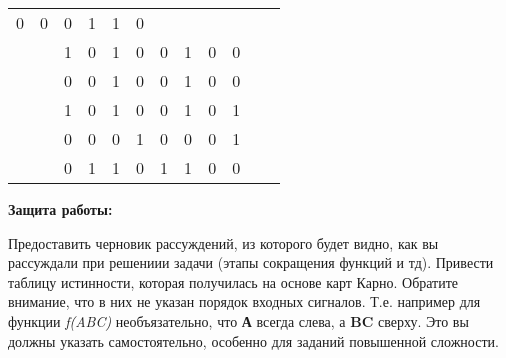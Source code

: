 \documentclass[12pt,a4paper,final,notitlepage]{article}
\begin{document}
\begin{table}[htbp]
\begin{minipage}{\textwidth}
\begin{tabular}{cccccccccccc}
  \multicolumn{1}{c|}{0} &
  \multicolumn{1}{c|}{0} &
  \multicolumn{1}{c|}{0} &
  \multicolumn{1}{c|}{1} &
  \multicolumn{1}{c|}{1} &
  \multicolumn{1}{c|}{0} &
   &
   \\ \cline{3-10}
 &
  \multicolumn{1}{c|}{} &
  \multicolumn{1}{c|}{1} &
  \multicolumn{1}{c|}{0} &
  \multicolumn{1}{c|}{1} &
  \multicolumn{1}{c|}{0} &
  \multicolumn{1}{c|}{0} &
  \multicolumn{1}{c|}{1} &
  \multicolumn{1}{c|}{0} &
  \multicolumn{1}{c|}{0} &
   &
   \\ \cline{3-10}
 &
  \multicolumn{1}{c|}{} &
  \multicolumn{1}{c|}{0} &
  \multicolumn{1}{c|}{0} &
  \multicolumn{1}{c|}{1} &
  \multicolumn{1}{c|}{0} &
  \multicolumn{1}{c|}{0} &
  \multicolumn{1}{c|}{1} &
  \multicolumn{1}{c|}{0} &
  \multicolumn{1}{c|}{0} &
   &
   \\ \cline{3-10}
 &
  \multicolumn{1}{c|}{} &
  \multicolumn{1}{c|}{1} &
  \multicolumn{1}{c|}{0} &
  \multicolumn{1}{c|}{1} &
  \multicolumn{1}{c|}{0} &
  \multicolumn{1}{c|}{0} &
  \multicolumn{1}{c|}{1} &
  \multicolumn{1}{c|}{0} &
  \multicolumn{1}{c|}{1} &
   &
   \\ \cline{3-10}
 &
  \multicolumn{1}{c|}{} &
  \multicolumn{1}{c|}{0} &
  \multicolumn{1}{c|}{0} &
  \multicolumn{1}{c|}{0} &
  \multicolumn{1}{c|}{1} &
  \multicolumn{1}{c|}{0} &
  \multicolumn{1}{c|}{0} &
  \multicolumn{1}{c|}{0} &
  \multicolumn{1}{c|}{1} &
   &
   \\ \cline{3-10}
 &
  \multicolumn{1}{c|}{} &
  \multicolumn{1}{c|}{0} &
  \multicolumn{1}{c|}{1} &
  \multicolumn{1}{c|}{1} &
  \multicolumn{1}{c|}{0} &
  \multicolumn{1}{c|}{1} &
  \multicolumn{1}{c|}{1} &
  \multicolumn{1}{c|}{0} &
  \multicolumn{1}{c|}{0} &
   &
   \\ \cline{3-10}
\end{tabular}
\end{minipage}
\end{table}

\textbf{Защита работы:} \\
\begin{flushleft}
\hspace*{15pt} Предоставить черновик рассуждений, из которого будет видно, как вы рассуждали при решениии задачи (этапы сокращения функций и тд). Привести таблицу истинности, которая получилась на основе карт Карно. Обратите внимание, что в них не указан порядок входных сигналов. Т.е. например для функции \textit{f(ABC)} необъязательно, что \textbf{А} всегда слева, а \textbf{BC} сверху. Это вы должны указать самостоятельно, особенно для заданий повышенной сложности.
\end{flushleft}
\end{document}
